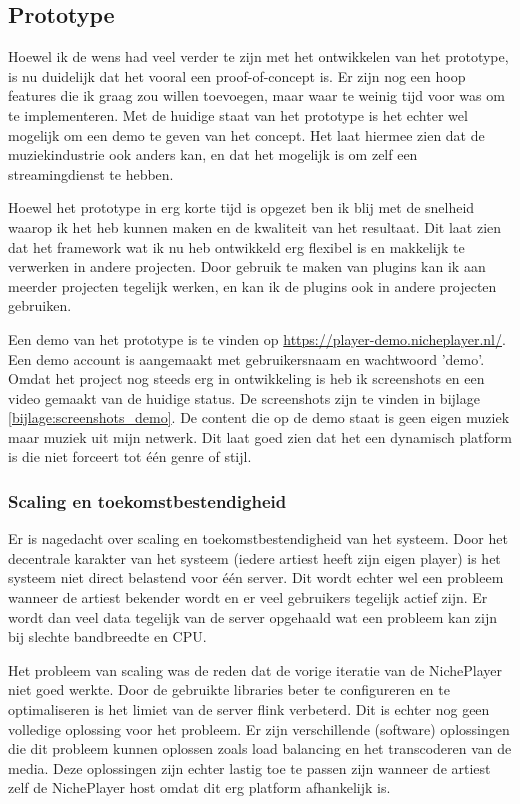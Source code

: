 \subsection{Prototype}
Hoewel ik de wens had veel verder te zijn met het ontwikkelen van het prototype, is nu duidelijk dat het vooral een proof-of-concept is. Er zijn nog een hoop features die ik graag zou willen toevoegen, maar waar te weinig tijd voor was om te implementeren. Met de huidige staat van het prototype is het echter wel mogelijk om een demo te geven van het concept. Het laat hiermee zien dat de muziekindustrie ook anders kan, en dat het mogelijk is om zelf een streamingdienst te hebben.

Hoewel het prototype in erg korte tijd is opgezet ben ik blij met de snelheid waarop ik het heb kunnen maken en de kwaliteit van het resultaat. Dit laat zien dat het framework wat ik nu heb ontwikkeld erg flexibel is en makkelijk te verwerken in andere projecten. Door gebruik te maken van plugins kan ik aan meerder projecten tegelijk werken, en kan ik de plugins ook in andere projecten gebruiken.

Een demo van het prototype is te vinden op \url{https://player-demo.nicheplayer.nl/}. Een demo account is aangemaakt met gebruikersnaam en wachtwoord 'demo'. Omdat het project nog steeds erg in ontwikkeling is heb ik screenshots en een video gemaakt van de huidige status. De screenshots zijn te vinden in bijlage \ref{bijlage:screenshots_demo}. De content die op de demo staat is geen eigen muziek maar muziek uit mijn netwerk. Dit laat goed zien dat het een dynamisch platform is die niet forceert tot één genre of stijl.

\subsubsection*{Scaling en toekomstbestendigheid}
Er is nagedacht over scaling en toekomstbestendigheid van het systeem. Door het decentrale karakter van het systeem (iedere artiest heeft zijn eigen player) is het systeem niet direct belastend voor één server. Dit wordt echter wel een probleem wanneer de artiest bekender wordt en er veel gebruikers tegelijk actief zijn. Er wordt dan veel data tegelijk van de server opgehaald wat een probleem kan zijn bij slechte bandbreedte en CPU.

Het probleem van scaling was de reden dat de vorige iteratie van de NichePlayer niet goed werkte. Door de gebruikte libraries beter te configureren en te optimaliseren is het limiet van de server flink verbeterd. Dit is echter nog geen volledige oplossing voor het probleem. Er zijn verschillende (software) oplossingen die dit probleem kunnen oplossen zoals load balancing en het transcoderen van de media. Deze oplossingen zijn echter lastig toe te passen zijn wanneer de artiest zelf de NichePlayer host omdat dit erg platform afhankelijk is. 

